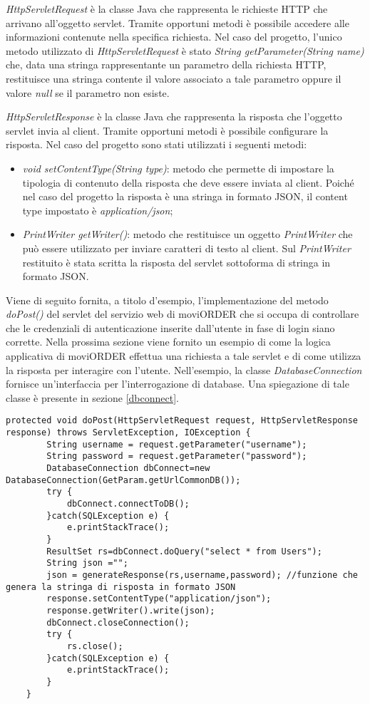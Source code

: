 \textit{HttpServletRequest} è la classe Java che rappresenta le richieste HTTP che arrivano all'oggetto servlet. Tramite opportuni metodi è possibile accedere alle informazioni contenute nella specifica richiesta. Nel caso del progetto, l'unico metodo utilizzato di \textit{HttpServletRequest} è stato \textit{String getParameter(String name)} che, data una stringa rappresentante un parametro della richiesta HTTP, restituisce una stringa contente il valore associato a tale parametro oppure il valore \textit{null} se il parametro non esiste.

\textit{HttpServletResponse} è la classe Java che rappresenta la risposta che l'oggetto servlet invia al client. Tramite opportuni metodi è possibile configurare la risposta. Nel caso del progetto sono stati utilizzati i seguenti metodi:
\begin{itemize}
	\item \textit{void setContentType(String type)}: metodo che permette di impostare la tipologia di contenuto della risposta che deve essere inviata al client. Poiché nel caso del progetto la risposta è una stringa in formato JSON, il content type impostato è \textit{application/json};
	\item \textit{PrintWriter getWriter()}: metodo che restituisce un oggetto \textit{PrintWriter} che può essere utilizzato per inviare caratteri di testo al client. Sul \textit{PrintWriter} restituito è stata scritta la risposta del servlet sottoforma di stringa in formato JSON.
\end{itemize}

Viene di seguito fornita, a titolo d'esempio, l'implementazione del metodo \textit{doPost()} del servlet del servizio web di moviORDER che si occupa di controllare che le credenziali di autenticazione inserite dall'utente in fase di login siano corrette. Nella prossima sezione viene fornito un esempio di come la logica applicativa di moviORDER effettua una richiesta a tale servlet e di come utilizza la risposta per interagire con l'utente. Nell'esempio, la classe \textit{DatabaseConnection} fornisce un'interfaccia per l'interrogazione di database. Una spiegazione di tale classe è presente in sezione \ref{dbconnect}.
\begin{lstlisting}
protected void doPost(HttpServletRequest request, HttpServletResponse response) throws ServletException, IOException {
		String username = request.getParameter("username");
		String password = request.getParameter("password");
		DatabaseConnection dbConnect=new DatabaseConnection(GetParam.getUrlCommonDB());
		try {
			dbConnect.connectToDB();
		}catch(SQLException e) {
			e.printStackTrace();
		} 
		ResultSet rs=dbConnect.doQuery("select * from Users");
		String json ="";
		json = generateResponse(rs,username,password); //funzione che genera la stringa di risposta in formato JSON
		response.setContentType("application/json");
		response.getWriter().write(json);
		dbConnect.closeConnection();
		try {
			rs.close();
		}catch(SQLException e) {
			e.printStackTrace();
		}
	}
\end{lstlisting}


